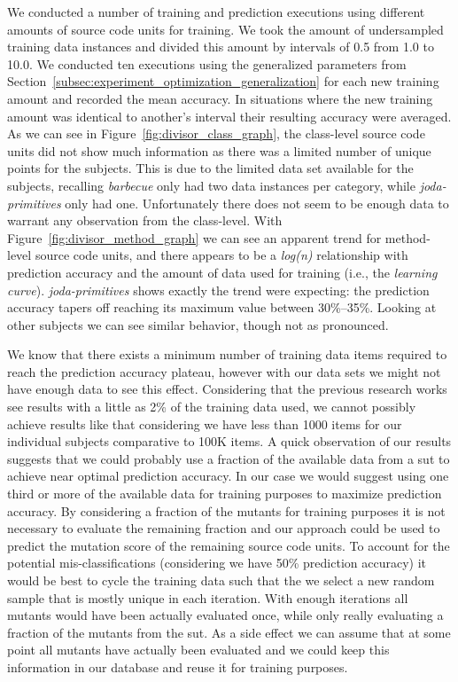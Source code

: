 We conducted a number of training and prediction executions using different amounts of source code units for training. We took the amount of undersampled training data instances and divided this amount by intervals of 0.5 from 1.0 to 10.0. We conducted ten executions using the generalized parameters from Section~\ref{subsec:experiment_optimization_generalization} for each new training amount and recorded the mean accuracy. In situations where the new training amount was identical to another's interval their resulting accuracy were averaged. As we can see in Figure~\ref{fig:divisor_class_graph}, the class-level source code units did not show much information as there was a limited number of unique points for the subjects. This is due to the limited data set available for the subjects, recalling \emph{barbecue} only had two data instances per category, while \emph{joda-primitives} only had one. Unfortunately there does not seem to be enough data to warrant any observation from the class-level. With Figure~\ref{fig:divisor_method_graph} we can see an apparent trend for method-level source code units, and there appears to be a \emph{log(n)} relationship with prediction accuracy and the amount of data used for training (i.e., the \emph{learning curve}). \emph{joda-primitives} shows exactly the trend were expecting: the prediction accuracy tapers off reaching its maximum value between 30\%--35\%. Looking at other subjects we can see similar behavior, though not as pronounced.

We know that there exists a minimum number of training data items required to reach the prediction accuracy plateau, however with our data sets we might not have enough data to see this effect. Considering that the previous research works see results with a little as 2\% of the training data used, we cannot possibly achieve results like that considering we have less than 1000 items for our individual subjects comparative to 100K items. A quick observation of our results suggests that we could probably use a fraction of the available data from a \gls{sut} to achieve near optimal prediction accuracy. In our case we would suggest using one third or more of the available data for training purposes to maximize prediction accuracy. By considering a fraction of the mutants for training purposes it is not necessary to evaluate the remaining fraction and our approach could be used to predict the mutation score of the remaining source code units. To account for the potential mis-classifications (considering we have 50\% prediction accuracy) it would be best to cycle the training data such that the we select a new random sample that is mostly unique in each iteration. With enough iterations all mutants would have been actually evaluated once, while only really evaluating a fraction of the mutants from the \gls{sut}. As a side effect we can assume that at some point all mutants have actually been evaluated and we could keep this information in our database and reuse it for training purposes.


